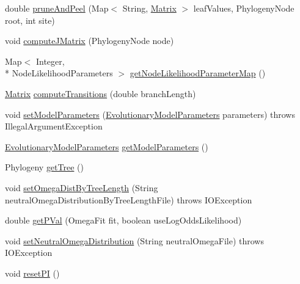 \begin{DoxyCompactItemize}
\item 
double \hyperlink{classbroad_1_1core_1_1siphy_1_1_evolutionary_model_a32d8bd38fc327de8c840c67a72cb54aa}{prune\+And\+Peel} (Map$<$ String, \hyperlink{class_jama_1_1_matrix}{Matrix} $>$ leaf\+Values, Phylogeny\+Node root, int site)
\item 
void \hyperlink{classbroad_1_1core_1_1siphy_1_1_evolutionary_model_a5db015308ac89579addc1e3db945dc14}{compute\+J\+Matrix} (Phylogeny\+Node node)
\item 
Map$<$ Integer, \\*
Node\+Likelihood\+Parameters $>$ \hyperlink{classbroad_1_1core_1_1siphy_1_1_evolutionary_model_aa8f9f0fbedc8a9f768fb1bbbef27c8f8}{get\+Node\+Likelihood\+Parameter\+Map} ()
\item 
\hyperlink{class_jama_1_1_matrix}{Matrix} \hyperlink{classbroad_1_1core_1_1siphy_1_1_evolutionary_model_a02f88c2dc38c01a5923f064477daaa51}{compute\+Transitions} (double branch\+Length)
\item 
void \hyperlink{classbroad_1_1core_1_1siphy_1_1_evolutionary_model_ad33990a2042c4e252c1df0957a4d8692}{set\+Model\+Parameters} (\hyperlink{classbroad_1_1core_1_1siphy_1_1_evolutionary_model_parameters}{Evolutionary\+Model\+Parameters} parameters)  throws Illegal\+Argument\+Exception
\item 
\hyperlink{classbroad_1_1core_1_1siphy_1_1_evolutionary_model_parameters}{Evolutionary\+Model\+Parameters} \hyperlink{classbroad_1_1core_1_1siphy_1_1_evolutionary_model_a8c96fbd3055894234ce347c0ad68e8eb}{get\+Model\+Parameters} ()
\item 
Phylogeny \hyperlink{classbroad_1_1core_1_1siphy_1_1_evolutionary_model_ae37b5f8381618f817dfabd2370a7241f}{get\+Tree} ()
\item 
void \hyperlink{classbroad_1_1core_1_1siphy_1_1_evolutionary_model_a7c19df7625f37c6e233846b11f840707}{set\+Omega\+Dist\+By\+Tree\+Length} (String neutral\+Omega\+Distribution\+By\+Tree\+Length\+File)  throws I\+O\+Exception 
\item 
double \hyperlink{classbroad_1_1core_1_1siphy_1_1_evolutionary_model_a897c4df0be1002ef9fda5180e2cf4f83}{get\+P\+Val} (Omega\+Fit fit, boolean use\+Log\+Odds\+Likelihood)
\item 
void \hyperlink{classbroad_1_1core_1_1siphy_1_1_evolutionary_model_ab540e39054069938170aaa3f45142110}{set\+Neutral\+Omega\+Distribution} (String neutral\+Omega\+File)  throws I\+O\+Exception 
\item 
void \hyperlink{classbroad_1_1core_1_1siphy_1_1_evolutionary_model_ac800e78776fd5e44c7f1ee0904358385}{reset\+P\+I} ()

\end{DoxyCompactItemize}
